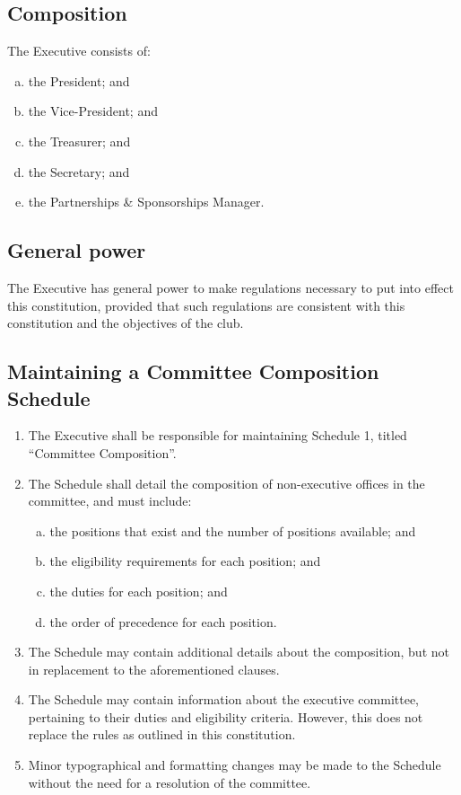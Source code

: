 \documentclass{constitution}
\begin{document}
\subsection{Composition}
The Executive consists of:
\begin{enumerate}[(a)]
    \item the President; and
    \item the Vice-President; and
    \item the Treasurer; and
    \item the Secretary; and
    \item the Partnerships \& Sponsorships Manager.
\end{enumerate}

\subsection{General power}
The Executive has general power to make regulations necessary to put into effect this constitution, provided that such regulations are consistent with this constitution and the objectives of the club.

\subsection{Maintaining a Committee Composition Schedule}\label{schedule1}
\begin{enumerate}[(1)]
    \item The Executive shall be responsible for maintaining Schedule 1, titled ``Committee Composition''.
    \item The Schedule shall detail the composition of non-executive offices in the committee, and must include:
          \begin{enumerate}[(a)]
              \item the positions that exist and the number of positions available; and
              \item the eligibility requirements for each position; and
              \item the duties for each position; and
              \item the order of precedence for each position.
          \end{enumerate}
    \item The Schedule may contain additional details about the composition, but not in replacement to the aforementioned clauses.
    \item The Schedule may contain information about the executive committee, pertaining to their duties and eligibility criteria. However, this does not replace the rules as outlined in this constitution.
    \item Minor typographical and formatting changes may be made to the Schedule without the need for a resolution of the committee.
\end{enumerate}
\end{document}
